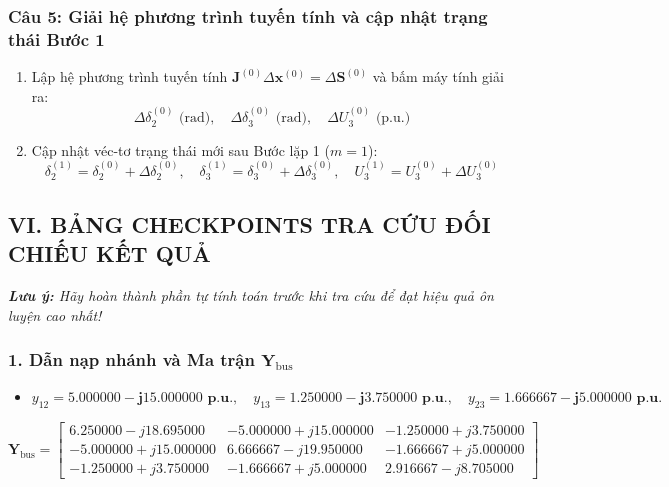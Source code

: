\documentclass[10.5pt,a4paper]{article}
\begin{document}
\subsubsection*{Câu 5: Giải hệ phương trình tuyến tính và cập nhật trạng thái Bước 1}
\begin{enumerate}\setlength{\itemsep}{2pt}\setlength{\parskip}{0pt}
    \item[5.1] Lập hệ phương trình tuyến tính $\mathbf{J}^{(0)} \Delta \mathbf{x}^{(0)} = \Delta \mathbf{S}^{(0)}$ và bấm máy tính giải ra:
    $$\Delta \delta_2^{(0)}\text{ (rad)}, \quad \Delta \delta_3^{(0)}\text{ (rad)}, \quad \Delta U_3^{(0)}\text{ (p.u.)}$$
    \item[5.2] Cập nhật véc-tơ trạng thái mới sau Bước lặp 1 ($m = 1$):
    $$\delta_2^{(1)} = \delta_2^{(0)} + \Delta \delta_2^{(0)}, \quad \delta_3^{(1)} = \delta_3^{(0)} + \Delta \delta_3^{(0)}, \quad U_3^{(1)} = U_3^{(0)} + \Delta U_3^{(0)}$$
\end{enumerate}

\clearpage

\subsection*{VI. BẢNG CHECKPOINTS TRA CỨU ĐỐI CHIẾU KẾT QUẢ}
\vspace{-4pt}
\textit{\textcolor{hustred}{\textbf{Lưu ý:}} Hãy hoàn thành phần tự tính toán trước khi tra cứu để đạt hiệu quả ôn luyện cao nhất!}

\subsubsection*{1. Dẫn nạp nhánh và Ma trận $\mathbf{Y}_{\text{bus}}$}
\vspace{-4pt}
\begin{itemize}\setlength{\itemsep}{1pt}\setlength{\parskip}{0pt}
    \item $y_{12} = \mathbf{5.000000 - j 15.000000\text{ p.u.}}, \quad y_{13} = \mathbf{1.250000 - j 3.750000\text{ p.u.}}, \quad y_{23} = \mathbf{1.666667 - j 5.000000\text{ p.u.}}$
\end{itemize}
\vspace{-4pt}
\begin{equation}
\mathbf{Y}_{\text{bus}} =
\begin{bmatrix}
6.250000 - j18.695000 & -5.000000 + j15.000000 & -1.250000 + j3.750000 \\
-5.000000 + j15.000000 & 6.666667 - j19.950000 & -1.666667 + j5.000000 \\
-1.250000 + j3.750000 & -1.666667 + j5.000000 & 2.916667 - j8.705000
\end{bmatrix}
\end{equation}
\end{document}
